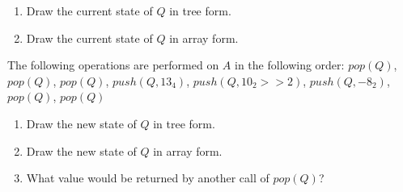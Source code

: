 \documentclass[11pt,addpoints]{exam}
\begin{document}
\begin{questions}

\question[1]{}


\newpage


\begin{enumerate}[label=(\Alph*)]
  \item Draw the current state of $Q$ in tree form.


  \item Draw the current state of $Q$ in array form.


\end{enumerate}

The following operations are performed on $A$ in the following order: $pop(Q)$, $pop(Q)$, $pop(Q)$, $push(Q, 13_{4})$, $push(Q, 10_{2} >> 2)$, $push(Q, -8_{2})$, $pop(Q)$, $pop(Q)$ \\

\begin{enumerate}[resume,label=(\Alph*)]
  \item Draw the new state of $Q$ in tree form.


  \item Draw the new state of $Q$ in array form.


  \item What value would be returned by another call of $pop(Q)$?


\end{enumerate}

\newpage





\question[1]{}



\question[1]{}


\end{questions}
\end{document}
